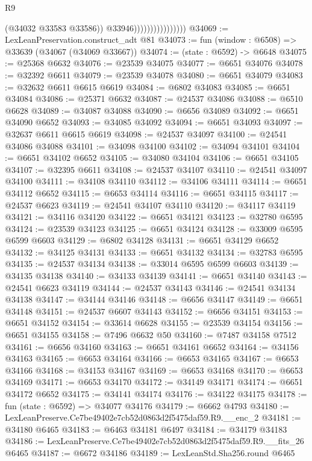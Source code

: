 \begin{lexlean}{R9}
\begin{coremodule}
                                      (@34032 @33583 @33586))
                                    @33946))))))))))))))))
@34069 := LexLeanPreservation.construct_adt @81
@34073 := fun (window : @6508) => @33639 (@34067 (@34069 @33667))
@34074 := (state : @6592) -> @6648
@34075 := @25368 @6632
@34076 := @23539 @34075
@34077 := @6651 @34076
@34078 := @32392 @6611
@34079 := @23539 @34078
@34080 := @6651 @34079
@34083 := @32632 @6611 @6615 @6619
@34084 := @6802 @34083
@34085 := @6651 @34084
@34086 := @25371 @6632
@34087 := @24537 @34086
@34088 := @6510 @6628
@34089 := @34087 @34088
@34090 := @6656 @34089
@34092 := @6651 @34090 @6652
@34093 := @34085 @34092
@34094 := @6651 @34093
@34097 := @32637 @6611 @6615 @6619
@34098 := @24537 @34097
@34100 := @24541 @34086 @34088
@34101 := @34098 @34100
@34102 := @34094 @34101
@34104 := @6651 @34102 @6652
@34105 := @34080 @34104
@34106 := @6651 @34105
@34107 := @32395 @6611
@34108 := @24537 @34107
@34110 := @24541 @34097 @34100
@34111 := @34108 @34110
@34112 := @34106 @34111
@34114 := @6651 @34112 @6652
@34115 := @6653 @34114
@34116 := @6651 @34115
@34117 := @24537 @6623
@34119 := @24541 @34107 @34110
@34120 := @34117 @34119
@34121 := @34116 @34120
@34122 := @6651 @34121
@34123 := @32780 @6595
@34124 := @23539 @34123
@34125 := @6651 @34124
@34128 := @33009 @6595 @6599 @6603
@34129 := @6802 @34128
@34131 := @6651 @34129 @6652
@34132 := @34125 @34131
@34133 := @6651 @34132
@34134 := @32783 @6595
@34135 := @24537 @34134
@34138 := @33014 @6595 @6599 @6603
@34139 := @34135 @34138
@34140 := @34133 @34139
@34141 := @6651 @34140
@34143 := @24541 @6623 @34119
@34144 := @24537 @34143
@34146 := @24541 @34134 @34138
@34147 := @34144 @34146
@34148 := @6656 @34147
@34149 := @6651 @34148
@34151 := @24537 @6607 @34143
@34152 := @6656 @34151
@34153 := @6651 @34152
@34154 := @33614 @6628
@34155 := @23539 @34154
@34156 := @6651 @34155
@34158 := @7496 @6632 @50
@34160 := @7487 @34158 @7512
@34161 := @6656 @34160
@34163 := @6651 @34161 @6652
@34164 := @34156 @34163
@34165 := @6653 @34164
@34166 := @6653 @34165
@34167 := @6653 @34166
@34168 := @34153 @34167
@34169 := @6653 @34168
@34170 := @6653 @34169
@34171 := @6653 @34170
@34172 := @34149 @34171
@34174 := @6651 @34172 @6652
@34175 := @34141 @34174
@34176 := @34122 @34175
@34178 := fun (state : @6592) => @34077 @34176
@34179 := @6662 @4793
@34180 := LexLeanPreserve.Ce7be49402e7cb52d0863d2f5475daf59.R9.__enc_2
@34181 := @34180 @6465
@34183 := @6463 @34181 @6497
@34184 := @34179 @34183
@34186 := LexLeanPreserve.Ce7be49402e7cb52d0863d2f5475daf59.R9.__fits_26 @6465
@34187 := @6672 @34186
@34189 := LexLeanStd.Sha256.round @6465

\end{coremodule}
\end{lexlean}
